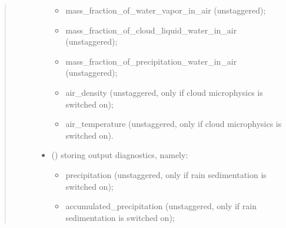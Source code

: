 \documentclass[letterpaper,10pt,english]{sphinxmanual}
\begin{document}
\begin{fulllineitems}
\begin{fulllineitems}
\begin{quote}
\begin{description}
\begin{itemize}
\begin{itemize}
\item {} 
mass\_fraction\_of\_water\_vapor\_in\_air (unstaggered);

\item {} 
mass\_fraction\_of\_cloud\_liquid\_water\_in\_air (unstaggered);

\item {} 
mass\_fraction\_of\_precipitation\_water\_in\_air (unstaggered);

\item {} 
air\_density (unstaggered, only if cloud microphysics is switched on);

\item {} 
air\_temperature (unstaggered, only if cloud microphysics is switched on).

\end{itemize}

\item {} 
 () \textendash{}  storing output diagnostics, namely:
\begin{itemize}
\item {} 
precipitation (unstaggered, only if rain sedimentation is switched on);

\item {} 
accumulated\_precipitation (unstaggered, only if rain sedimentation is switched on);

\end{itemize}

\end{itemize}


\end{description}\end{quote}

\end{fulllineitems}



\end{fulllineitems}
\end{document}
